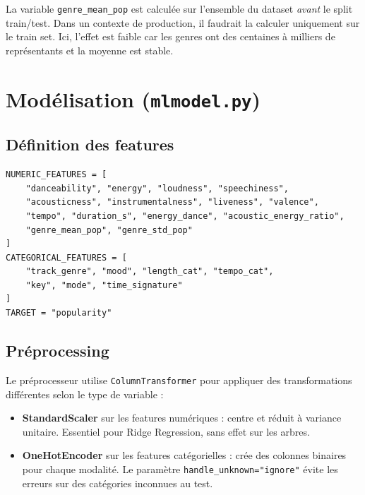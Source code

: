 \documentclass[12pt, a4paper]{article}
\begin{document}
\begin{infobox}
La variable \texttt{genre\_mean\_pop} est calculée sur l'ensemble du dataset \textit{avant}
le split train/test. Dans un contexte de production, il faudrait la calculer uniquement
sur le train set. Ici, l'effet est faible car les genres ont des centaines à milliers
de représentants et la moyenne est stable.
\end{infobox}

\section{Modélisation (\texttt{mlmodel.py})}

\subsection{Définition des features}

\begin{codebox}
\begin{lstlisting}
NUMERIC_FEATURES = [
    "danceability", "energy", "loudness", "speechiness",
    "acousticness", "instrumentalness", "liveness", "valence",
    "tempo", "duration_s", "energy_dance", "acoustic_energy_ratio",
    "genre_mean_pop", "genre_std_pop"
]
CATEGORICAL_FEATURES = [
    "track_genre", "mood", "length_cat", "tempo_cat",
    "key", "mode", "time_signature"
]
TARGET = "popularity"
\end{lstlisting}
\end{codebox}

\subsection{Préprocessing}

Le préprocesseur utilise \texttt{ColumnTransformer} pour appliquer des transformations
différentes selon le type de variable :

\begin{itemize}[leftmargin=1.5cm]
  \item \textbf{StandardScaler} sur les features numériques : centre et réduit à
        variance unitaire. Essentiel pour Ridge Regression, sans effet sur les arbres.
  \item \textbf{OneHotEncoder} sur les features catégorielles :
        crée des colonnes binaires pour chaque modalité.
        Le paramètre \texttt{handle\_unknown="ignore"} évite les erreurs sur des
        catégories inconnues au test.
\end{itemize}
\end{document}
